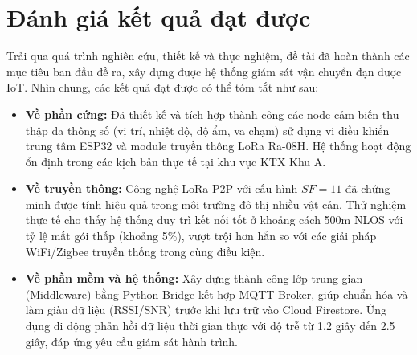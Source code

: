 \section{Đánh giá kết quả đạt được}
Trải qua quá trình nghiên cứu, thiết kế và thực nghiệm, đề tài đã hoàn thành các mục tiêu ban đầu đề ra, xây dựng được hệ thống giám sát vận chuyển đạn dược IoT. Nhìn chung, các kết quả đạt được có thể tóm tắt như sau:

\begin{itemize}
    \item \textbf{Về phần cứng:} Đã thiết kế và tích hợp thành công các node cảm biến thu thập đa thông số (vị trí, nhiệt độ, độ ẩm, va chạm) sử dụng vi điều khiển trung tâm ESP32 và module truyền thông LoRa Ra-08H. Hệ thống hoạt động ổn định trong các kịch bản thực tế tại khu vực KTX Khu A.
    \item \textbf{Về truyền thông:} Công nghệ LoRa P2P với cấu hình $SF=11$ đã chứng minh được tính hiệu quả trong môi trường đô thị nhiều vật cản. Thử nghiệm thực tế cho thấy hệ thống duy trì kết nối tốt ở khoảng cách 500m NLOS với tỷ lệ mất gói thấp (khoảng 5\%), vượt trội hơn hẳn so với các giải pháp WiFi/Zigbee truyền thống trong cùng điều kiện.
    \item \textbf{Về phần mềm và hệ thống:} Xây dựng thành công lớp trung gian (Middleware) bằng Python Bridge kết hợp MQTT Broker, giúp chuẩn hóa và làm giàu dữ liệu (RSSI/SNR) trước khi lưu trữ vào Cloud Firestore. Ứng dụng di động phản hồi dữ liệu thời gian thực với độ trễ từ 1.2 giây đến 2.5 giây, đáp ứng yêu cầu giám sát hành trình.
\end{itemize}


